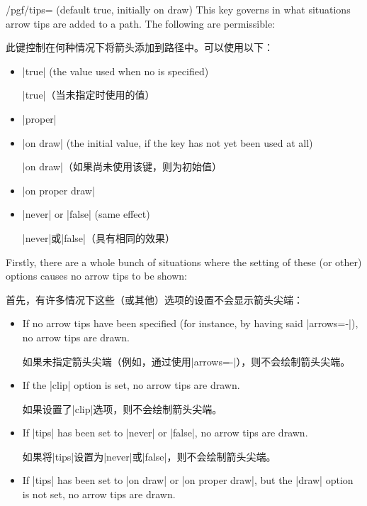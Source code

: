\begin{key}{/pgf/tips= (default true, initially on draw)}
    This key governs in what situations arrow tips are added to a path. The
    following  are permissible:

    此键控制在何种情况下将箭头添加到路径中。可以使用以下：
    \begin{itemize}
        \item |true| (the value used when no  is specified)

        |true|（当未指定时使用的值）
        \item |proper|
        \item |on draw| (the initial value, if the key has not yet been used
            at all)

            |on draw|（如果尚未使用该键，则为初始值）
        \item |on proper draw|
        \item |never| or |false| (same effect)

        |never|或|false|（具有相同的效果）
    \end{itemize}

    Firstly, there are a whole bunch of situations where the setting of
    these (or other) options causes no arrow tips to be shown:
    
    首先，有许多情况下这些（或其他）选项的设置不会显示箭头尖端：

    \begin{itemize}
        \item If no arrow tips have been specified (for instance, by having
            said |arrows=-|), no arrow tips are drawn.

            如果未指定箭头尖端（例如，通过使用|arrows=-|），则不会绘制箭头尖端。

        \item If the |clip| option is set, no arrow tips are drawn.

        如果设置了|clip|选项，则不会绘制箭头尖端。
        \item If |tips| has been set to |never| or |false|, no arrow tips are
            drawn.
        
            如果将|tips|设置为|never|或|false|，则不会绘制箭头尖端。

            \item If |tips| has been set to |on draw| or |on proper draw|, but
            the |draw| option is not set, no arrow tips are drawn.


\end{itemize}
\end{key}
